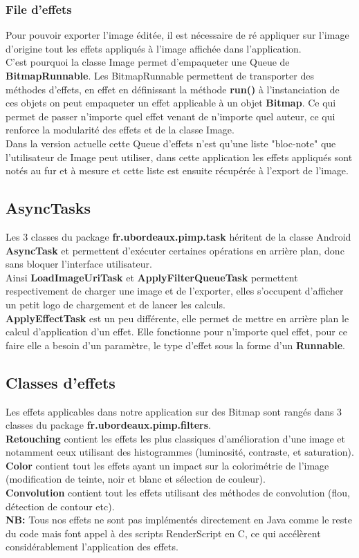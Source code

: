 \subsubsection{File d'effets} \label{file_effets}
Pour pouvoir exporter l'image éditée, il est nécessaire de ré appliquer sur l'image d'origine tout les effets appliqués à l'image affichée dans l'application.
\\
C'est pourquoi la classe Image permet d'empaqueter une Queue de \textbf{BitmapRunnable}. Les BitmapRunnable permettent de transporter des méthodes d'effets, en effet en définissant la méthode \textbf{run()} à l'instanciation de ces objets on peut empaqueter un effet applicable à un objet \textbf{Bitmap}. Ce qui permet de passer n'importe quel effet venant de n'importe quel auteur, ce qui renforce la modularité des effets et de la classe Image.
\\
Dans la version actuelle cette Queue d'effets n'est qu'une liste "bloc-note" que l'utilisateur de Image peut utiliser, dans cette application les effets appliqués sont notés au fur et à mesure et cette liste est ensuite récupérée à l'export de l'image.


\subsection{AsyncTasks}
Les 3 classes du package \textbf{fr.ubordeaux.pimp.task} héritent de la classe Android \textbf{AsyncTask} et permettent d'exécuter certaines opérations en arrière plan, donc sans bloquer l'interface utilisateur.
\\
Ainsi \textbf{LoadImageUriTask} et \textbf{ApplyFilterQueueTask} permettent respectivement de charger une image et de l'exporter, elles s'occupent d'afficher un petit logo de chargement et de lancer les calculs.
\\
\textbf{ApplyEffectTask} est un peu différente, elle permet de mettre en arrière plan le calcul d'application d'un effet. Elle fonctionne pour n'importe quel effet, pour ce faire elle a besoin d'un paramètre, le type d'effet sous la forme d'un \textbf{Runnable}.

\subsection{Classes d'effets}
Les effets applicables dans notre application sur des Bitmap sont rangés dans 3 classes du package \textbf{fr.ubordeaux.pimp.filters}.
\\
\textbf{Retouching} contient les effets les plus classiques d'amélioration d'une image et notamment ceux utilisant des histogrammes (luminosité, contraste, et saturation).
\\
\textbf{Color} contient tout les effets ayant un impact sur la colorimétrie de l'image (modification de teinte, noir et blanc et sélection de couleur).
\\
\textbf{Convolution} contient tout les effets utilisant des méthodes de convolution (flou, détection de contour etc).
\\
\textbf{NB:} Tous nos effets ne sont pas implémentés directement en Java comme le reste du code mais font appel à des scripts RenderScript en C, ce qui accélèrent considérablement l'application des effets.


